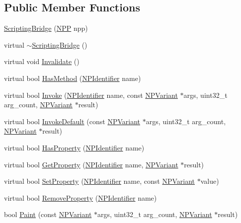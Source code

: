 \subsection*{Public Member Functions}
\begin{DoxyCompactItemize}
\item 
\hyperlink{classpi__generator_1_1_scripting_bridge_abcc778b6a4c482dff1ed271d7e776e42}{ScriptingBridge} (\hyperlink{struct___n_p_p}{NPP} npp)
\item 
virtual \hyperlink{classpi__generator_1_1_scripting_bridge_a605567080f40ddb9a6c2fa4ea9f2e876}{$\sim$ScriptingBridge} ()
\item 
virtual void \hyperlink{classpi__generator_1_1_scripting_bridge_a581ae88aa4acbefc30ae563452ab2fd5}{Invalidate} ()
\item 
virtual bool \hyperlink{classpi__generator_1_1_scripting_bridge_aaa99f91c8ced5df6fac0700516cdd058}{HasMethod} (\hyperlink{npruntime_8h_a3ce51391e08bd3e24128c342b1d055b9}{NPIdentifier} name)
\item 
virtual bool \hyperlink{classpi__generator_1_1_scripting_bridge_a3518781037308ae1d63bcdf5cc77a3de}{Invoke} (\hyperlink{npruntime_8h_a3ce51391e08bd3e24128c342b1d055b9}{NPIdentifier} name, const \hyperlink{struct___n_p_variant}{NPVariant} $\ast$args, uint32\_\-t arg\_\-count, \hyperlink{struct___n_p_variant}{NPVariant} $\ast$result)
\item 
virtual bool \hyperlink{classpi__generator_1_1_scripting_bridge_a0589fe559ec8b9297e37239233e238be}{InvokeDefault} (const \hyperlink{struct___n_p_variant}{NPVariant} $\ast$args, uint32\_\-t arg\_\-count, \hyperlink{struct___n_p_variant}{NPVariant} $\ast$result)
\item 
virtual bool \hyperlink{classpi__generator_1_1_scripting_bridge_a55f52d9e5e377367881e919db10b019f}{HasProperty} (\hyperlink{npruntime_8h_a3ce51391e08bd3e24128c342b1d055b9}{NPIdentifier} name)
\item 
virtual bool \hyperlink{classpi__generator_1_1_scripting_bridge_ab97693ce171c216783e79debb3b192cc}{GetProperty} (\hyperlink{npruntime_8h_a3ce51391e08bd3e24128c342b1d055b9}{NPIdentifier} name, \hyperlink{struct___n_p_variant}{NPVariant} $\ast$result)
\item 
virtual bool \hyperlink{classpi__generator_1_1_scripting_bridge_aa87ffdeb58a36a1e352814132d4a020a}{SetProperty} (\hyperlink{npruntime_8h_a3ce51391e08bd3e24128c342b1d055b9}{NPIdentifier} name, const \hyperlink{struct___n_p_variant}{NPVariant} $\ast$value)
\item 
virtual bool \hyperlink{classpi__generator_1_1_scripting_bridge_ab1a46993e1a36b9857d48776f7085aa2}{RemoveProperty} (\hyperlink{npruntime_8h_a3ce51391e08bd3e24128c342b1d055b9}{NPIdentifier} name)
\item 
bool \hyperlink{classpi__generator_1_1_scripting_bridge_afcd2c9c3e990cae2d713e8bb5d84048d}{Paint} (const \hyperlink{struct___n_p_variant}{NPVariant} $\ast$args, uint32\_\-t arg\_\-count, \hyperlink{struct___n_p_variant}{NPVariant} $\ast$result)
\end{DoxyCompactItemize}
